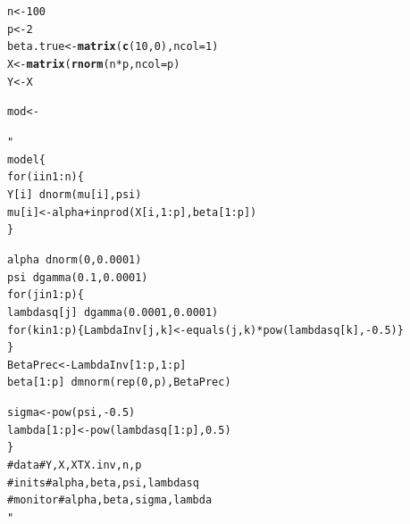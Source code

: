 \documentclass{beamer}\usepackage[]{graphicx}\usepackage[]{color}
\makeatletter
\newcommand{\hlstr}[1]{\textcolor[rgb]{0.192,0.494,0.8}{#1}}%
\newcommand{\hlstd}[1]{\textcolor[rgb]{0.345,0.345,0.345}{#1}}%
\newcommand{\hlkwb}[1]{\textcolor[rgb]{0.69,0.353,0.396}{#1}}%
\newcommand{\hlkwd}[1]{\textcolor[rgb]{0.737,0.353,0.396}{\textbf{#1}}}%
\newenvironment{kframe}{%
 \def\at@end@of@kframe{}%
 \ifinner\ifhmode%
  \def\at@end@of@kframe{\end{minipage}}%
  \begin{minipage}{\columnwidth}%
 \fi\fi%
 \def\FrameCommand##1{\hskip\@totalleftmargin \hskip-\fboxsep
 \colorbox{shadecolor}{##1}\hskip-\fboxsep
     \hskip-\linewidth \hskip-\@totalleftmargin \hskip\columnwidth}%
 \MakeFramed {\advance\hsize-\width
   \@totalleftmargin\z@ \linewidth\hsize
   \@setminipage}}%
 {\par\unskip\endMakeFramed%
 \at@end@of@kframe}
\newenvironment{knitrout}{}{} %
\makeatother
\begin{document}
\newsavebox{\ipriorjagsforshow}
\begin{lrbox}{\ipriorjagsforshow}
\begin{knitrout}\small
{}\color{fgcolor}\begin{kframe}
\begin{alltt}
n <- 100
p <- 2
beta.true <- \hlkwd{matrix}(\hlkwd{c}(10, 0), ncol = 1)
X <- \hlkwd{matrix}(\hlkwd{rnorm}(n * p, ncol = p)
Y <- X %
\end{alltt}
\end{kframe}
\end{knitrout}
\end{lrbox}



\newsavebox{\ipriorjagsb}
\begin{lrbox}{\ipriorjagsb}
\begin{knitrout}\scriptsize
{}\color{fgcolor}\begin{kframe}
\begin{alltt}
\hlstd{mod} \hlkwb{<-} \hlstr{"
  model \{
    for (i in 1:n) \{  
      Y[i] ~ dnorm(mu[i], psi)  
      mu[i] <- alpha + inprod(X[i,1:p], beta[1:p])  
    \}
  
    alpha ~ dnorm(0, 0.0001)
    psi ~ dgamma(0.1, 0.0001)
    for (j in 1:p) \{ 
      lambdasq[j] ~ dgamma(0.0001, 0.0001)
      for (k in 1:p) \{ LambdaInv[j, k] <- equals(j,k) * pow(lambdasq[k], -0.5) \}
    \}  
    BetaPrec <- LambdaInv[1:p, 1:p] %
    beta[1:p] ~ dmnorm(rep(0, p), BetaPrec)  
    
    sigma <- pow(psi, -0.5)
    lambda[1:p] <- pow(lambdasq[1:p], 0.5)
  \}
  #data# Y, X, XTX.inv, n, p
  #inits# alpha, beta, psi, lambdasq
  #monitor# alpha, beta, sigma, lambda
"}
\end{alltt}
\end{kframe}
\end{knitrout}
\end{lrbox}
\end{document}
